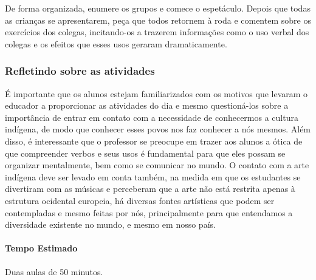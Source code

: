 \documentclass[11pt]{extarticle}
\begin{document}


De forma organizada, enumere os grupos e comece o espetáculo. Depois que todas as crianças se apresentarem, peça que todos retornem à roda e comentem sobre os exercícios dos colegas, incitando-os a trazerem informações como o uso verbal dos colegas e os efeitos que esses usos geraram dramaticamente. 



\subsubsection{Refletindo sobre as atividades}


É importante que os alunos estejam familiarizados com os motivos que levaram o educador a proporcionar as atividades do dia e mesmo questioná-los sobre a importância de entrar em contato com a necessidade de conhecermos a cultura indígena, de modo que conhecer esses povos nos faz conhecer a nós mesmos. Além disso, é interessante que o professor se preocupe em trazer aos alunos a ótica de que compreender verbos e seus usos é fundamental para que eles possam se organizar mentalmente, bem como se comunicar no mundo. O contato com a arte indígena deve ser levado em conta também, na medida em que os estudantes se divertiram com as músicas e perceberam que a arte não está restrita apenas à estrutura ocidental europeia, há diversas fontes artísticas que podem ser contempladas e mesmo feitas por nós, principalmente para que entendamos a diversidade existente no mundo, e mesmo em nosso país.

\paragraph{Tempo Estimado} Duas aulas de 50 minutos. 
\end{document}
